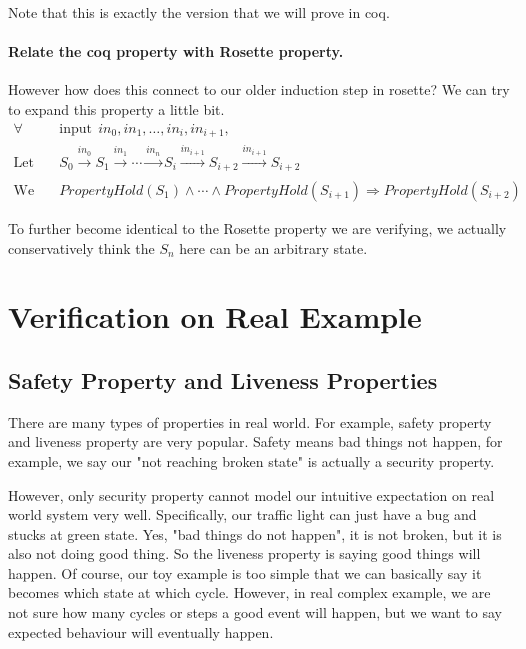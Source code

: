 \documentclass{article}
\begin{document}
Note that this is exactly the version that we will prove in coq.




\paragraph{Relate the coq property with Rosette property.}
However how does this connect to our older induction step in rosette?
We can try to expand this property a little bit.
\begin{align*}
\forall &~~ \text{input} ~~ in_0, in_1, \dots, in_i, in_{i+1}, \\
\text{Let} &~~ S_0 \xrightarrow[]{in_0} S_{1} \xrightarrow[]{in_1} \cdots \xrightarrow[]{in_n} S_{i} \xrightarrow[]{in_{i+1}} S_{i+2} \xrightarrow[]{in_{i+1}} S_{i+2} \\
\text{We have} &~~ PropertyHold(S_{1}) \land \cdots \land PropertyHold(S_{i+1}) \Rightarrow PropertyHold(S_{i+2})
\end{align*}

To further become identical to the Rosette property we are verifying, we actually conservatively think the $S_{n}$ here can be an arbitrary state.




\section{Verification on Real Example}

\subsection{Safety Property and Liveness Properties}

There are many types of properties in real world.
For example, safety property and liveness property are very popular.
Safety means bad things not happen, for example, we say our "not reaching broken state" is actually a security property.

However, only security property cannot model our intuitive expectation on real world system very well.
Specifically, our traffic light can just have a bug and stucks at green state.
Yes, "bad things do not happen", it is not broken, but it is also not doing good thing.
So the liveness property is saying good things will happen.
Of course, our toy example is too simple that we can basically say it becomes which state at which cycle.
However, in real complex example, we are not sure how many cycles or steps a good event will happen, but we want to say expected behaviour will eventually happen.
\end{document}
